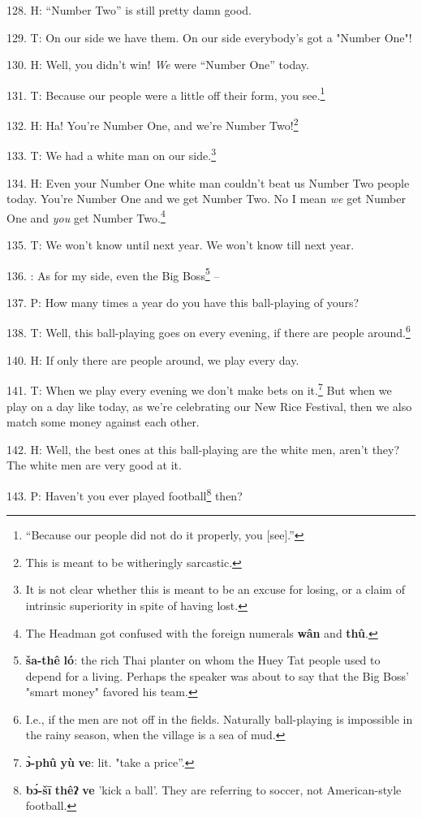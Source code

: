 128. H: ``Number Two'' is still pretty damn good.

129. T: On our side we have them. On our side everybody's got a "Number
One"!

130. H: Well, you didn't win! \textit{We} were ``Number One'' today.

131. T: Because our people were a little off their form, you see.\footnote{``Because our people did not do it properly, you [see].''}

132. H: Ha! You're Number One, and we're Number Two!\footnote{This is meant to be witheringly sarcastic.}

133. T: We had a white man on our side.\footnote{It is not clear whether this is meant to be an excuse for losing, or a claim of intrinsic superiority in spite of having lost.}

134. H: Even your Number One white man couldn't beat us Number Two people today.
You're Number One and we get Number Two. No I mean \textit{we} get Number One and
\textit{you} get Number Two.\footnote{The Headman got confused with the foreign numerals \textbf{wân} and \textbf{thû}.}

135. T: We won't know until next year. We won't know till next year.

136. : As for my side, even the Big Boss\footnote{\textbf{ša-thê} \textbf{ló}: the rich Thai planter on whom the Huey Tat people used to depend for a living. Perhaps the speaker was about to say that the Big Boss' "smart money" favored his team.} --

137. P: How many times a year do you have this ball-playing of yours?

138. T: Well, this ball-playing goes on every evening, if there are people around.\footnote{I.e., if the men are not off in the fields. Naturally ball-playing is impossible in the rainy season, when the village is a sea of mud.}

140. H: If only there are people around, we play every day.

141. T: When we play every evening we don't make bets on it.\footnote{\textbf{ɔ̀-phû} \textbf{yù} \textbf{ve}: lit. "take a price''.} But when we play
on a day like today, as we're celebrating our New Rice Festival, then we also match
some money against each other.

142. H: Well, the best ones at this ball-playing are the white men, aren't they?
The white men are very good at it.

143. P: Haven't you ever played football\footnote{\textbf{bɔ́-šī} \textbf{thêʔ} \textbf{ve} 'kick a ball'. They are referring to soccer, not American-style football.} then?

